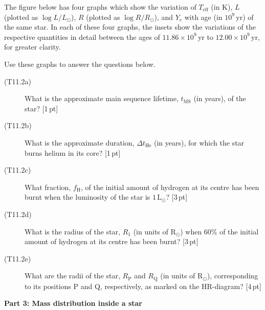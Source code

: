 The figure below has four graphs which show the variation of
$T_{\mathrm{eff}}$ (in K), $L$ (plotted as $\log L/L_\odot$), $R$ (plotted as
$\log R/R_\odot$), and $Y_{\mathrm{c}}$ with age (in $10^9$\,yr) of the same
star. In each of these four graphs, the insets show the variations of the
respective quantities in detail between the ages of $11.86\times10^9$\,yr to
$12.00\times10^9$\,yr, for greater clarity.

Use these graphs to answer the questions below.
\begin{description}
\item[(T11.2a)] What is the approximate main sequence lifetime,
  $t_{\mathrm{MS}}$ (in years), of the star? \hfill[1\,pt]
\item[(T11.2b)] What is the approximate duration, $\Delta t_{\mathrm{He}}$ (in
  years), for which the star burns helium in its core? \hfill[1\,pt]
\item[(T11.2c)] What fraction, $f_{\mathrm{H}}$, of the initial amount of
  hydrogen at its centre has been burnt when the luminosity of the star is
  $1\,\mathrm{L_\odot}$? \hfill[3\,pt]
\item[(T11.2d)] What is the radius of the star, $R_1$ (in units of
  $\mathrm{R_\odot}$) when 60\% of the initial amount of hydrogen at its centre
  has been burnt? \hfill[3\,pt]
\item[(T11.2e)] What are the radii of the star, $R_{\mathrm{P}}$ and
  $R_{\mathrm{Q}}$ (in units of $\mathrm{R_\odot}$), corresponding to its
  positions P and Q, respectively, as marked on the HR-diagram? \hfill[4\,pt]
\end{description}

\medskip\noindent\textbf{Part 3: Mass distribution inside a star}

